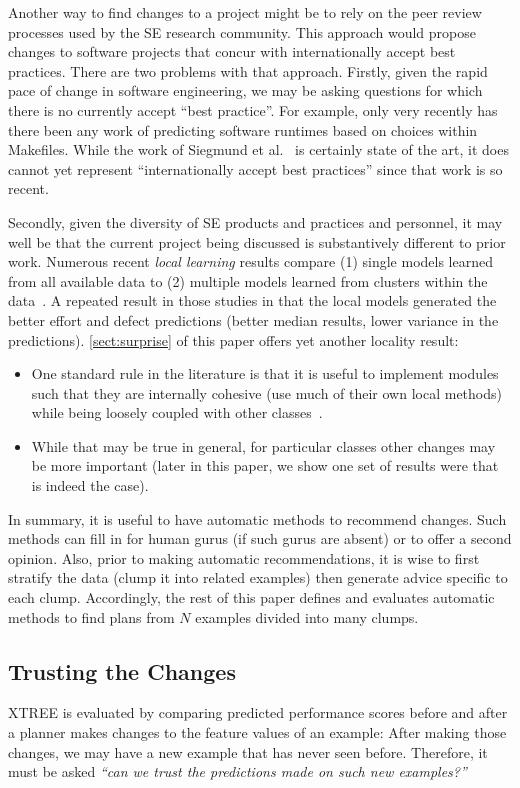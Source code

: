 \documentclass{sig-alternate}
\newcommand{\bi}{\begin{itemize}}
\newcommand{\ei}{\end{itemize}}
\newcommand{\tion}[1]{\textsection\ref{sect:#1}}
\begin{document}
 
Another way  to find   changes to a project
might be to rely
on the peer review processes used by the 
SE research community. This approach would propose changes to software
projects that concur with internationally accept best practices. 
There are two
problems with that approach. Firstly, given the rapid pace of change in software
engineering, we may be asking questions for which there is no currently accept
``best practice''. For example, only very recently has there been any work
of predicting software runtimes based on choices within Makefiles. While the work
of Siegmund et al.~\cite{sven12} is certainly state of the art, it does
cannot yet represent ``internationally accept best practices'' since that work is so
recent. 

Secondly, given the diversity of SE products and practices
and personnel, it may well be that the current project being discussed is 
substantively different to prior work. 
Numerous recent {\em local learning} results compare (1) single models
learned from all available data to (2) multiple models learned from clusters within the data~\cite{betten14,yang11,yang13,minku13,me12d,me11m,posnett11}.
A repeated result in those studies in that the local models generated the better effort
and defect predictions (better median results,
lower variance in the predictions). \tion{surprise} of this  paper offers yet another locality result:
\bi
\item
One standard rule in the literature
is that it is useful to implement modules such that they are internally cohesive (use
much of their own local methods) while being loosely coupled with other classes~\cite{Dhama199565}.
\item
While that may be true in general, for particular classes other changes may be more important
(later in this paper, we show one set of results were that is indeed the case).
\ei
In summary, 
it is useful to have automatic methods to recommend changes. Such
methods can fill in for human gurus (if such gurus are absent) or 
to offer a second opinion.
Also, prior to making automatic recommendations, it is wise to first stratify the data
(clump it into related examples) then generate advice specific to each clump.
Accordingly, the rest of this paper defines and evaluates
automatic methods to find plans from
  $N$ examples divided  into  many clumps.





\subsection{Trusting the Changes}\label{sect:trust}
   XTREE is evaluated by  comparing
predicted performance scores before and after a planner makes changes to the feature values of an example:
After making those
changes, we may have a new example that has never seen before. Therefore, it must be asked
{\em ``can we trust the predictions made on such new examples?''}
 
\end{document}
